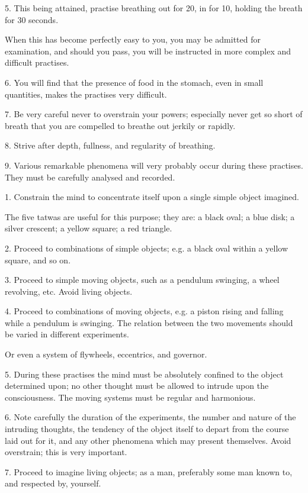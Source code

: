 5. This being attained, practise breathing out for 20, in for 10, holding the breath for 30 seconds.

When this has become perfectly easy to you, you may be admitted for examination, and should you pass, you will be instructed in more complex and difficult practises.

6. You will find that the presence of food in the stomach, even in small quantities, makes the practises very difficult.

7. Be very careful never to overstrain your powers; especially never get so short of breath that you are compelled to breathe out jerkily or rapidly.

8. Strive after depth, fullness, and regularity of breathing.

9. Various remarkable phenomena will very probably occur during these practises. They must be carefully analysed and recorded.



1. Constrain the mind to concentrate itself upon a single simple object imagined.

The five tatwas are useful for this purpose; they are: a black oval; a blue disk; a silver crescent; a yellow square; a red triangle.

2. Proceed to combinations of simple objects; e.g. a black oval within a yellow square, and so on.

3. Proceed to simple moving objects, such as a pendulum swinging, a wheel revolving, etc. Avoid living objects.

4. Proceed to combinations of moving objects, e.g. a piston rising and falling while a pendulum is swinging. The relation between the two movements should be varied in different experiments.

Or even a system of flywheels, eccentrics, and governor.

5. During these practises the mind must be absolutely confined to the object determined upon; no other thought must be allowed to intrude upon the consciousness. The moving systems must be regular and harmonious.

6. Note carefully the duration of the experiments, the number and nature of the intruding thoughts, the tendency of the object itself to depart from the course laid out for it, and any other phenomena which may present themselves. Avoid overstrain; this is very important.

7. Proceed to imagine living objects; as a man, preferably some man known to, and respected by, yourself.

